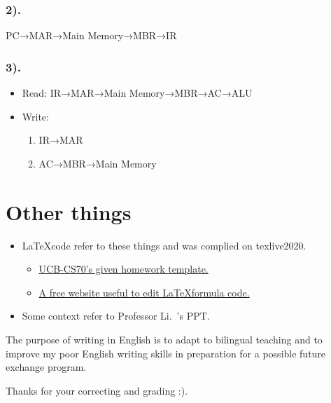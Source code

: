 \documentclass[11pt]{article}  %
\begin{document}
\subsubsection*{2). }

PC→MAR→Main Memory→MBR→IR

\subsubsection*{3). }

\begin{itemize}
    \item Read: IR→MAR→Main Memory→MBR→AC→ALU
    \item Write: 
    \begin{enumerate}
        \item IR→MAR
        \item AC→MBR→Main Memory
    \end{enumerate}
\end{itemize}

\section*{Other things}

\begin{itemize}
    \item \LaTeX \space code refer to these things and was complied on texlive2020. 
    \begin{itemize}
        \item  \href{https://www.eecs70.org/assets/misc/homework_template.tex}{UCB-CS70's given homework template.} 
        \item  \href{https://www.latexlive.com}{A free website useful to edit \LaTeX \space formula code.}
    \end{itemize}
    \item Some context refer to Professor Li.~'s PPT.
\end{itemize}

The purpose of writing in English is to adapt to bilingual teaching and to improve my poor English 
writing skills in preparation for a possible future exchange program. 

    Thanks for your correcting and grading :).
\end{document}
